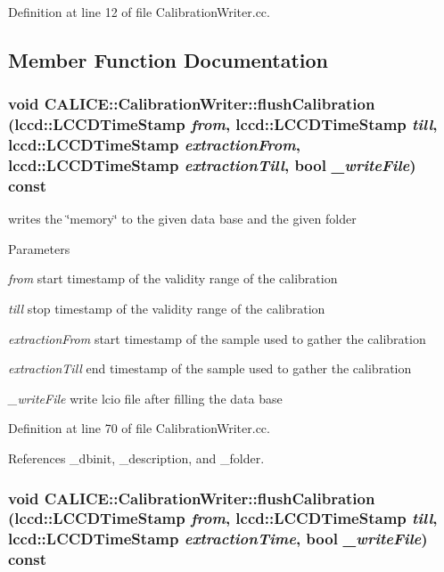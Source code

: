 Definition at line 12 of file CalibrationWriter.cc.

\subsection{Member Function Documentation}
\subsubsection[{flushCalibration}]{\setlength{\rightskip}{0pt plus 5cm}void CALICE::CalibrationWriter::flushCalibration (lccd::LCCDTimeStamp {\em from}, \/  lccd::LCCDTimeStamp {\em till}, \/  lccd::LCCDTimeStamp {\em extractionFrom}, \/  lccd::LCCDTimeStamp {\em extractionTill}, \/  bool {\em \_\-writeFile}) const}\label{classCALICE_1_1CalibrationWriter_ad30ea2d438f115bb37538525c0612d03}


writes the \char`\"{}memory\char`\"{} to the given data base and the given folder 
\begin{DoxyParams}{Parameters}
\item[{\em from}]start timestamp of the validity range of the calibration \item[{\em till}]stop timestamp of the validity range of the calibration \item[{\em extractionFrom}]start timestamp of the sample used to gather the calibration \item[{\em extractionTill}]end timestamp of the sample used to gather the calibration \item[{\em \_\-writeFile}]write lcio file after filling the data base \end{DoxyParams}


Definition at line 70 of file CalibrationWriter.cc.

References \_\-dbinit, \_\-description, and \_\-folder.
\subsubsection[{flushCalibration}]{\setlength{\rightskip}{0pt plus 5cm}void CALICE::CalibrationWriter::flushCalibration (lccd::LCCDTimeStamp {\em from}, \/  lccd::LCCDTimeStamp {\em till}, \/  lccd::LCCDTimeStamp {\em extractionTime}, \/  bool {\em \_\-writeFile}) const}\label{classCALICE_1_1CalibrationWriter_a049e75751a91ecbd92f03d9b7c04ec07}


